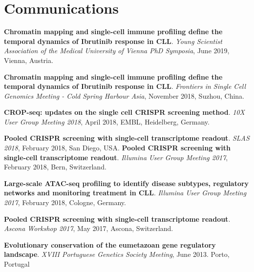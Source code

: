 \documentclass[11pt,a4paper,roman]{moderncv} %
\begin{document}
\section{Communications}
        \begin{etaremune}[leftmargin=1.0cm,itemindent=0pt,topsep=10pt,itemsep=2pt,partopsep=0pt,parsep=0pt]
        \item
        \textbf{Chromatin mapping and single-cell immune profiling define the temporal dynamics of Ibrutinib response in CLL}. \textit{Young Scientist Association of the Medical University of Vienna PhD Symposia}, June 2019, Vienna, Austria.
        \item
        \textbf{Chromatin mapping and single-cell immune profiling define the temporal dynamics of Ibrutinib response in CLL}. \textit{Frontiers in Single Cell Genomics Meeting - Cold Spring Harbour Asia}, November 2018, Suzhou, China.
        \item
        \textbf{CROP-seq: updates on the single cell CRISPR screening method}. \textit{10X User Group Meeting 2018}, April 2018, EMBL, Heidelberg, Germany.
        \item
        \textbf{Pooled CRISPR screening with single-cell transcriptome readout}. \textit{SLAS 2018}, February 2018, San Diego, USA.
        \textbf{Pooled CRISPR screening with single-cell transcriptome readout}. \textit{Illumina User Group Meeting 2017}, February 2018, Bern, Switzerland.
        \item
        \textbf{Large-scale ATAC-seq profiling to identify disease subtypes, regulatory networks and monitoring treatment in CLL}. \textit{Illumina User Group Meeting 2017}, February 2018, Cologne, Germany.
        \item
        \textbf{Pooled CRISPR screening with single-cell transcriptome readout}. \textit{Ascona Workshop 2017}, May 2017, Ascona, Switzerland.
        \item
        \textbf{Evolutionary conservation of the eumetazoan gene regulatory landscape}. \textit{XVIII Portuguese Genetics Society Meeting}, June 2013. Porto, Portugal
        \end{etaremune}
\end{document}
